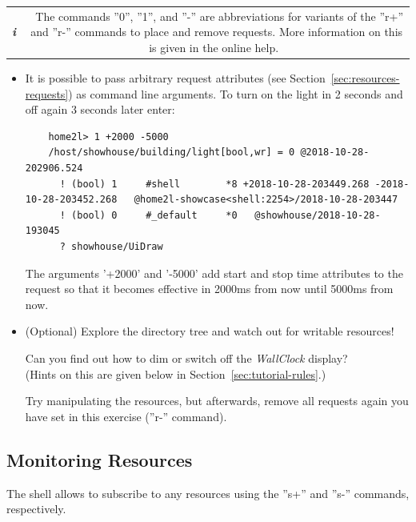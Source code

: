 \documentclass[12pt,english,parskip=half]{scrreprt}
\newcommand{\infobox}[1]{
  \hfill
  \setlength\arrayrulewidth{1pt}
  \begin{tabular}[t]{c|c|}
    \parbox{1.8em}{\hfill\textit{\Huge\textbf{i}\,}}
    &
    \,\parbox{0.89\linewidth}{\setlength{\parskip}{0.5em}#1}\,
  \end{tabular}
  \par
}
\begin{document}
\infobox{
  The commands ''0'', ''1'', and ''-'' are abbreviations for variants of the ''r+'' and ''r-''
  commands to place and remove requests. More information on this is given in the online help.
}

\begin{itemize}[$\blacktriangleright$]

\item
  It is possible to pass arbitrary request attributes (see Section~\ref{sec:resources-requests})
  as command line arguments. To turn on the light in 2 seconds and off
  again 3 seconds later enter:
  \begin{lstlisting}
    home2l> 1 +2000 -5000
    /host/showhouse/building/light[bool,wr] = 0 @2018-10-28-202906.524
      ! (bool) 1     #shell        *8 +2018-10-28-203449.268 -2018-10-28-203452.268   @home2l-showcase<shell:2254>/2018-10-28-203447
      ! (bool) 0     #_default     *0   @showhouse/2018-10-28-193045
      ? showhouse/UiDraw
  \end{lstlisting}
  The arguments '+2000' and '-5000' add start and stop time attributes to
  the request so that it becomes effective in 2000ms from now until 5000ms
  from now.

\item
  (Optional) Explore the directory tree and watch out for writable resources!

  Can you find out how to dim or switch off the \emph{WallClock} display? \\
  (Hints on this are given below in Section~\ref{sec:tutorial-rules}.)

  Try manipulating the resources, but afterwards, remove all requests again you
  have set in this exercise (''r-'' command).

\end{itemize}



\subsection{Monitoring Resources}
\label{sec:tutorial-shell-monitor}


The shell allows to subscribe to any resources using the ''s+'' and ''s-'' commands, respectively.
\end{document}
